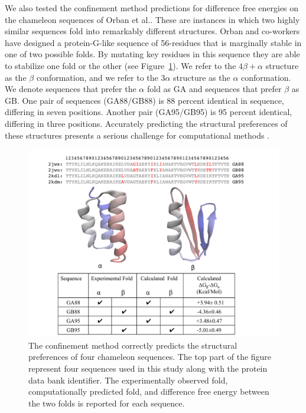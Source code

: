 \documentclass[12pt]{article}
\begin{document}
We also tested the confinement method predictions for difference free energies on the chameleon sequences of Orban et
al.\cite{Alexander2007,He2008,Alexander2009,Bryan2010,He2012}. These are instances in which two highly
similar sequences fold into remarkably different structures. Orban and co-workers have designed a protein-G-like
sequence of 56-residues that is marginally stable in one of two possible folds. By mutating key residues in this
sequence they are able to stabilize one fold or the other (see Figure~\ref{fig:orban}). We refer to the $4\beta +
\alpha$ structure as the $\beta$ conformation, and we refer to the $3\alpha$ structure as the
$\alpha$ conformation. We denote sequences that prefer the $\alpha$ fold as GA and sequences that
prefer $\beta$ as GB. One
pair of sequences (GA88/GB88) is 88 percent identical in sequence, differing in seven positions. Another pair
(GA95/GB95) is 95 percent identical, differing in three positions. Accurately predicting the structural preferences of
these structures presents a serious challenge for computational
methods \cite{Allison2011}. 

\begin{figure}
    \begin{center}
    \includegraphics[width=5.0in]{orban.pdf}
    \end{center}
    \caption{The confinement method correctly predicts the structural preferences of four chameleon sequences. The top
        part of the figure represent four sequences used in this study along with the protein data bank identifier. The
        experimentally observed fold, computationally predicted fold, and difference free energy between the two folds
        is reported for each sequence.}
\label{fig:orban}
\end{figure}
\end{document}
